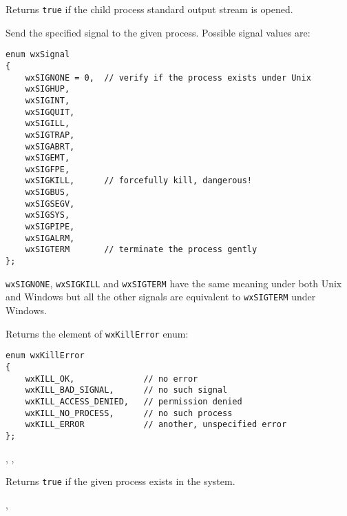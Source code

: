 Returns {\tt true} if the child process standard output stream is opened.

\label{wxprocesskill}


Send the specified signal to the given process. Possible signal values are:

\begin{verbatim}
enum wxSignal
{
    wxSIGNONE = 0,  // verify if the process exists under Unix
    wxSIGHUP,
    wxSIGINT,
    wxSIGQUIT,
    wxSIGILL,
    wxSIGTRAP,
    wxSIGABRT,
    wxSIGEMT,
    wxSIGFPE,
    wxSIGKILL,      // forcefully kill, dangerous!
    wxSIGBUS,
    wxSIGSEGV,
    wxSIGSYS,
    wxSIGPIPE,
    wxSIGALRM,
    wxSIGTERM       // terminate the process gently
};
\end{verbatim}

{\tt wxSIGNONE}, {\tt wxSIGKILL} and {\tt wxSIGTERM} have the same meaning
under both Unix and Windows but all the other signals are equivalent to
{\tt wxSIGTERM} under Windows.

Returns the element of {\tt wxKillError} enum:

\begin{verbatim}
enum wxKillError
{
    wxKILL_OK,              // no error
    wxKILL_BAD_SIGNAL,      // no such signal
    wxKILL_ACCESS_DENIED,   // permission denied
    wxKILL_NO_PROCESS,      // no such process
    wxKILL_ERROR            // another, unspecified error
};
\end{verbatim}


,\rtfsp
{},\rtfsp
{}

\label{wxprocessexists}


Returns {\tt true} if the given process exists in the system.


,\rtfsp
{}

\label{wxprocessonterminate}


